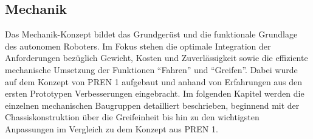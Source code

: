 \documentclass[main.tex]{subfiles} %
\begin{document}

\subsection{Mechanik}

Das Mechanik-Konzept bildet das Grundgerüst und die funktionale Grundlage des 
autonomen Roboters. Im Fokus stehen die optimale Integration der Anforderungen 
bezüglich Gewicht, Kosten und Zuverlässigkeit sowie die effiziente mechanische 
Umsetzung der Funktionen \enquote{Fahren} und \enquote{Greifen}. Dabei wurde auf dem Konzept 
von PREN 1 aufgebaut und anhand von Erfahrungen aus den ersten Prototypen 
Verbesserungen eingebracht. Im folgenden Kapitel werden die einzelnen 
mechanischen Baugruppen detailliert beschrieben, beginnend mit der 
Chassiskonstruktion über die Greifeinheit bis hin zu den wichtigsten 
Anpassungen im Vergleich zu dem Konzept aus PREN 1.


\newpage


\newpage


\newpage
\end{document}
